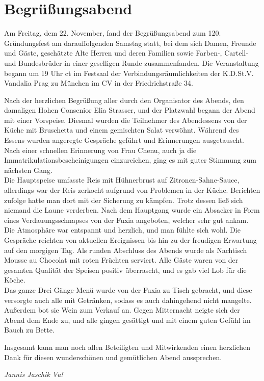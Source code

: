 \section{Begrüßungsabend}

\begin{multicols}{2}
Am Freitag, dem 22. November, fand der Begrüßungsabend zum 120.
Gründungsfest am darauffolgenden Samstag statt, bei dem sich Damen, Freunde und
Gäste, geschätzte Alte Herren und deren Familien sowie Farben-, Cartell- und Bundesbrüder
in einer geselligen Runde zusammenfanden. Die Veranstaltung begann um 19 Uhr ct
im Festsaal der Verbindungsräumlichkeiten der K.D.St.V. Vandalia Prag zu
München im CV in der Friedrichstraße 34.

Nach der herzlichen Begrüßung aller durch den Organisator des Abends, den
damaligen Hohen Consenior Elia Strasser, und der Platzwahl begann der Abend mit
einer Vorspeise. Diesmal wurden die Teilnehmer des Abendessens von der Küche
mit Bruschetta und einem gemischten Salat verwöhnt. Während des Essens wurden
angeregte Gespräche geführt und Erinnerungen ausgetauscht. Nach einer schnellen
Erinnerung von Frau Chenu, auch ja die Immatrikulationsbescheinigungen
einzureichen, ging es mit guter Stimmung zum nächsten Gang.\\
Die Hauptspeise umfasste Reis mit Hühnerbrust auf Zitronen-Sahne-Sauce,
allerdings war der Reis zerkocht aufgrund von Problemen in der Küche. Berichten
zufolge hatte man dort mit der Sicherung zu kämpfen. Trotz dessen ließ sich
niemand die Laune verderben. Nach dem Hauptgang wurde ein Absacker in Form
eines Verdauungsschnapses von der Fuxia angeboten, welcher sehr gut ankam.\\
Die Atmosphäre war entspannt und herzlich, und man fühlte sich wohl. Die
Gespräche reichten von aktuellen Ereignissen bis hin zu der freudigen Erwartung
auf den morgigen Tag. Als runden Abschluss des Abends wurde als Nachtisch
Mousse au Chocolat mit roten Früchten serviert. Alle Gäste waren von der
gesamten Qualität der Speisen positiv überrascht, und es gab viel Lob für die
Köche.\\
Das ganze Drei-Gänge-Menü wurde von der Fuxia zu Tisch gebracht, und diese
versorgte auch alle mit Getränken, sodass es auch dahingehend nicht mangelte.
Außerdem bot sie Wein zum Verkauf an. Gegen Mitternacht neigte sich der Abend dem
Ende zu, und alle gingen gesättigt und mit einem guten Gefühl im Bauch zu
Bette.

Insgesamt kann man noch allen Beteiligten und Mitwirkenden einen
herzlichen Dank für diesen wunderschönen und gemütlichen Abend aussprechen.

	\begin{flushright}
		\hfill\emph{Jannis Jaschik Va!}
	\end{flushright}
\end{multicols}
